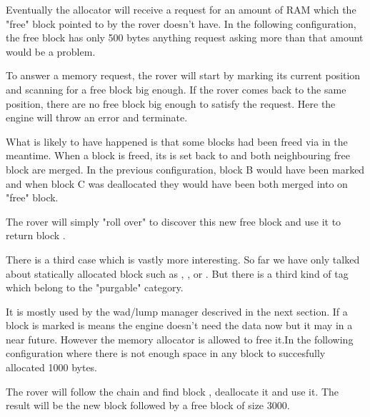 Eventually the allocator will receive a request for an amount of RAM which the "free" block pointed to by the rover doesn't have. In the following configuration, the free block has only 500 bytes anything request asking more than that amount would be a problem.\\
\par
{}
\par
To answer a memory request, the rover will start by marking its current position and scanning for a free block big enough. If the rover comes back to the same position, there are no free block big enough to satisfy the request. Here the engine will throw an error and terminate.\\
\par
What is likely to have happened is that some blocks had been freed via  in the meantime. When a block is freed, its  is set back to  and both neighbouring free block are merged. In the previous configuration, block B would have been marked  and when block C was deallocated they would have been both merged into on "free" block.\\
\par
{}
\par
The rover will simply "roll over" to discover this new free block and use it to return block .\\
\par
{}
\par
There is a third case which is vastly more interesting. So far we have only talked about statically allocated block such as , , or . But there is a third kind of tag which belong to the "purgable" category.\\
\par
 It is mostly used by the wad/lump manager descrived in the next section. If a block is marked  is means the engine doesn't need the data now but it may in a near future. However the memory allocator is allowed to free it.In the following configuration where there is not enough space in any block to succesfully allocated 1000 bytes.\\
\par
{}
\par
The rover will follow the chain and find block , deallocate it and use it. The result will be the new block  followed by a free block of size 3000.\\
\par
{}
\par

